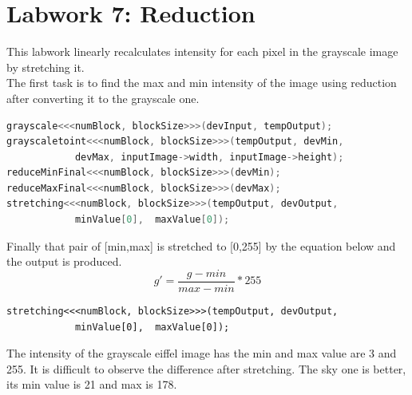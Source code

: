 \documentclass{article}
\begin{document}
\section{Labwork 7: Reduction}
This labwork linearly recalculates intensity for each pixel in the grayscale image by stretching it. \\

The first task is to find the max and min intensity of the image using reduction after converting it to the grayscale one.

\begin{lstlisting}[language=C]
grayscale<<<numBlock, blockSize>>>(devInput, tempOutput);
grayscaletoint<<<numBlock, blockSize>>>(tempOutput, devMin,
            devMax, inputImage->width, inputImage->height);
reduceMinFinal<<<numBlock, blockSize>>>(devMin);
reduceMaxFinal<<<numBlock, blockSize>>>(devMax);
stretching<<<numBlock, blockSize>>>(tempOutput, devOutput,
            minValue[0],  maxValue[0]);
\end{lstlisting}

Finally that pair of [min,max] is stretched to [0,255] by the equation below and the output is produced.
\begin{equation}
    g' = \frac{g - min}{max -min} *255
\end{equation}
\begin{lstlisting}
stretching<<<numBlock, blockSize>>>(tempOutput, devOutput,
            minValue[0],  maxValue[0]);
\end{lstlisting}

The intensity of the grayscale eiffel image has the min and max value are 3 and 255. It is difficult to observe the difference after stretching. The sky one is better, its min value is 21 and max is 178. 
\end{document}

